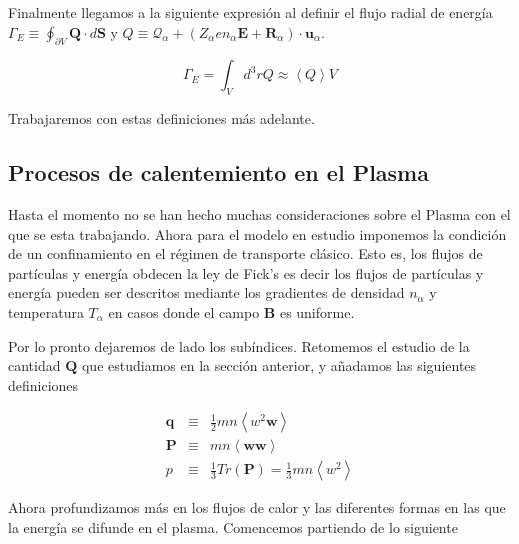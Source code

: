 \documentclass[11pt]{article}
\theoremstyle{definition}
\begin{document}
    Finalmente llegamos a la siguiente expresi\'on al definir el flujo radial de energ\'ia $\Gamma_E \equiv \oint_{\partial V} \textbf{Q}\cdot d\textbf{S}$ y $Q \equiv \mathcal{Q}_\alpha + (Z_\alpha e n_\alpha\textbf{E} + \textbf{R}_\alpha)\cdot\textbf{u}_\alpha$.

    \begin{equation}
      \Gamma_E = \int_Vd^3r Q \approx \left<Q\right>V
    \end{equation}

    Trabajaremos con estas definiciones m\'as adelante.

  \subsection{Procesos de calentemiento en el Plasma}

  Hasta el momento no se han hecho muchas consideraciones sobre el Plasma con el que se esta trabajando. Ahora para el modelo en estudio imponemos la condici\'on de un confinamiento en el r\'egimen de transporte cl\'asico. Esto es, los flujos de part\'iculas y energía obdecen la ley de Fick's es decir los flujos de part\'iculas y energ\'ia pueden ser descritos mediante los gradientes de densidad $n_\alpha$ y temperatura $T_\alpha$ en casos donde el campo $\textbf{B}$ es uniforme.

  Por lo pronto dejaremos de lado los sub\'indices. Retomemos el estudio de la cantidad $\textbf{Q}$ que estudiamos en la secci\'on anterior, y añadamos las siguientes definiciones

  \begin{eqnarray}
    \textbf{q} &\equiv& \frac{1}{2}mn\left<w^2\textbf{w}\right>\label{eq:q} \\
    \textbf{P} &\equiv&  mn\left<\textbf{ww}\right>\label{eq:tensorP} \\
    p &\equiv& \frac{1}{3}Tr(\textbf{P}) = \frac{1}{3}mn\left<w^2\right> \label{eq:pressureanisotropic}
  \end{eqnarray}

  Ahora profundizamos m\'as en los flujos de calor y las diferentes formas en las que la energ\'ia se difunde en el plasma. Comencemos partiendo de lo siguiente
\end{document}
